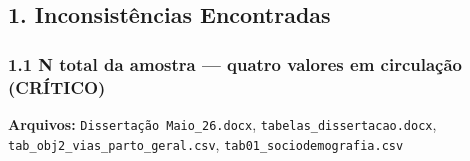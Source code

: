 \documentclass[
]{article}
\begin{document}
\hypertarget{inconsistuxeancias-encontradas}{%
\subsection{1. Inconsistências
Encontradas}\label{inconsistuxeancias-encontradas}}

\hypertarget{n-total-da-amostra-quatro-valores-em-circulauxe7uxe3o-cruxedtico}{%
\subsubsection{1.1 N total da amostra --- quatro valores em circulação
(CRÍTICO)}\label{n-total-da-amostra-quatro-valores-em-circulauxe7uxe3o-cruxedtico}}

\textbf{Arquivos:} \texttt{Dissertação\ Maio\_26.docx},
\texttt{tabelas\_dissertacao.docx},
\texttt{tab\_obj2\_vias\_parto\_geral.csv},
\texttt{tab01\_sociodemografia.csv}
\end{document}
